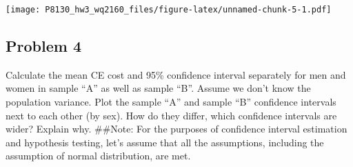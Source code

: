 \documentclass[
]{article}
\newenvironment{Shaded}{\begin{snugshade}}{\end{snugshade}}
\newcommand{\AttributeTok}[1]{\textcolor[rgb]{0.77,0.63,0.00}{#1}}
\newcommand{\DecValTok}[1]{\textcolor[rgb]{0.00,0.00,0.81}{#1}}
\newcommand{\FunctionTok}[1]{\textcolor[rgb]{0.00,0.00,0.00}{#1}}
\newcommand{\NormalTok}[1]{#1}
\newcommand{\OtherTok}[1]{\textcolor[rgb]{0.56,0.35,0.01}{#1}}
\newcommand{\SpecialCharTok}[1]{\textcolor[rgb]{0.00,0.00,0.00}{#1}}
\newcommand{\StringTok}[1]{\textcolor[rgb]{0.31,0.60,0.02}{#1}}
\begin{document}
\begin{Shaded}
\end{Shaded}

\texttt{[image: P8130\_hw3\_wq2160\_files/figure-latex/unnamed-chunk-5-1.pdf]}

\hypertarget{problem-4}{%
\subsection{Problem 4}\label{problem-4}}

Calculate the mean CE cost and 95\% confidence interval separately for
men and women in sample ``A'' as well as sample ``B''. Assume we don't
know the population variance. Plot the sample ``A'' and sample ``B''
confidence intervals next to each other (by sex). How do they differ,
which confidence intervals are wider? Explain why. \#\#Note: For the
purposes of confidence interval estimation and hypothesis testing, let's
assume that all the assumptions, including the assumption of normal
distribution, are met.
\end{document}
